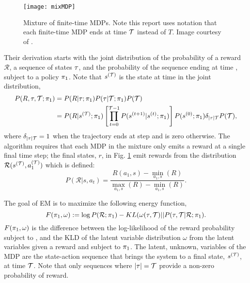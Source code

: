     \begin{figure}
        \centering
        \texttt{[image: mixMDP]}
        \caption{Mixture of finite-time MDPs. Note this report uses notation that each finite-time MDP ends at time
                 $\mathcal{T}$ instead of $T$. Image courtesy of \cite{toussaint2010expectation}.}
        \label{fig:mixMDP}
    \end{figure}

    Their derivation starts with the joint distribution of the probability of a reward $\mathcal{R}$, a sequence of
    states $\tau$, and the probability of the sequence ending at time \Tau, subject to a policy $\pi_{1}$. Note that
    $s^{(\mathcal{T})}$ is the state at time \Tau in the joint distribution,
    \begin{equation} \label{eq:em_joint_dist}
        \begin{split}
            P(R,\tau,\mathcal{T};\pi_{1})
                & = P(R|\tau;\pi_{1})P(\tau|\mathcal{T};\pi_{1})P(\mathcal{T}) \\
                & = P(R|s^{(\mathcal{T})};\pi_{1})\left[\prod_{t=0}^{\mathcal{T}-1}P(s^{(t+1)}|s^{(t)};\pi_{1})\right]
                        P(s^{(0)};\pi_{1})\delta_{|\tau|\mathcal{T}}P(\mathcal{T}),
        \end{split}
    \end{equation}
    where $\delta_{|\tau|\mathcal{T}}=1$ when the trajectory ends at step \Tau and is zero otherwise. The algorithm requires
    that each MDP in the mixture only emits a reward at a single final time step; the final states, $r$, in Fig.
    \ref{fig:mixMDP} emit rewards from the distribution $\mathcal{R}(s^{(\mathcal{T})},a_1^{(\mathcal{T})})$ which is defined:
    \[
    P(\mathcal{R}|s,a_t) = \frac{R(a_1,s) - \min_{a_1,s}(R)}{\max_{a_1,s}(R) - \min_{a_1,s}(R)}.
    \]

    \par
    The goal of EM is to maximize the following energy function,
    \[
    F(\pi_{1},\omega) := \log P(\mathcal{R};\pi_{1}) - KL(\omega(\tau,\mathcal{T})||P(\tau,\mathcal{T}|\mathcal{R};\pi_{1}).
    \]
    $F(\pi_{1},\omega)$ is the difference between the log-likelihood of the reward probability subject to ,
    and the \ac{KLD} of the latent variable distribution $\omega$ from the latent variables given a reward and subject
    to $\pi_{1}$. The latent, unknown, variables of the \ac{MDP} are the state-action sequence that brings the system
    to a final state, $s^{(\mathcal{T})}$, at time $\mathcal{T}$. Note that only sequences where $|\tau|= \mathcal{T}$ provide a non-zero
    probability of reward.

